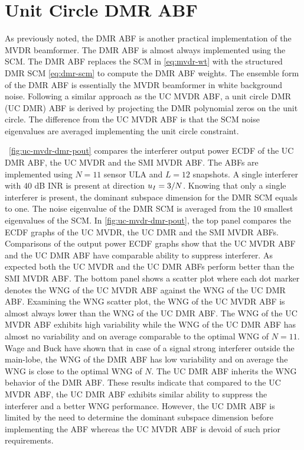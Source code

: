 \section{ Unit Circle DMR ABF}
\label{sec:uc-mvdr-dmr}
As previously noted, the DMR ABF is another practical implementation
of the MVDR beamformer. The DMR ABF is almost always implemented using
the SCM. The DMR ABF replaces the SCM in \eqref{eq:mvdr-wt} with the
structured DMR SCM \eqref{eq:dmr-scm} to compute the DMR ABF
weights. The ensemble form of the DMR ABF is essentially the MVDR
beamformer in white background noise. Following a
similar approach as the UC MVDR ABF, a unit circle DMR (UC DMR) ABF is
derived by projecting the DMR polynomial zeros on the unit circle. The
difference from the UC MVDR ABF is that the SCM noise eigenvalues are
averaged implementing the unit circle constraint.
  
\figurename{}~\ref{fig:uc-mvdr-dmr-pout} compares the interferer
output power ECDF of the UC DMR ABF, the UC MVDR and the SMI MVDR
ABF. The ABFs are implemented using $N = 11$ sensor ULA and $L = 12$
snapshots. A single interferer with $40$ dB INR is present at
direction $u_I = 3/N$. Knowing that only a single interferer is
present, the dominant subspace dimension for the DMR SCM equals to
one. The noise eigenvalue of the DMR SCM is averaged from the $10$
smallest eigenvalues of the SCM. In
\figurename{}\ref{fig:uc-mvdr-dmr-pout}, the top panel compares the
ECDF graphs of the UC MVDR, the UC DMR and the SMI MVDR
ABFs. Comparisons of the output power ECDF graphs show that the UC
MVDR ABF and the UC DMR ABF have comparable ability to suppress
interferer. As expected both the UC MVDR and the UC DMR ABFs perform
better than the SMI MVDR ABF. The bottom panel shows a scatter plot
where each dot marker denotes the WNG of the UC MVDR ABF against the
WNG of the UC DMR ABF. Examining the WNG scatter plot, the WNG of the
UC MVDR ABF is almost always lower than the WNG of the UC DMR ABF. The
WNG of the UC MVDR ABF exhibits high variability while the WNG of the
UC DMR ABF has almost no variability and on average comparable to the
optimal WNG of $N = 11$. Wage and Buck have shown that in case of a
signal strong interferer outside the main-lobe, the WNG of the DMR ABF
has low variability and on average the WNG is close to the optimal WNG
of $N$\cite{wage2013dmr}. The UC DMR ABF inherits the WNG behavior of
the DMR ABF. These results indicate that compared to the UC MVDR ABF,
the UC DMR ABF exhibits similar ability to suppress the interferer
and a better WNG performance. However, the UC DMR ABF is limited by
the need to determine the dominant subspace dimension before
implementing the ABF whereas the UC MVDR ABF is devoid of such prior
requirements.

